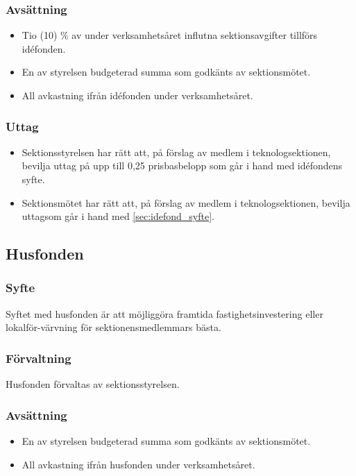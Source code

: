 \documentclass[a4paper, 10pt]{article}
\begin{document}
\subsubsection{Avsättning}
\begin{itemize}
\item Tio (10) \% av under verksamhetsåret influtna sektionsavgifter tillförs idéfonden.
\item En av styrelsen budgeterad summa som godkänts av sektionsmötet.
\item All avkastning ifrån idéfonden under verksamhetsåret.
\end{itemize}
\subsubsection{Uttag}
\begin{itemize}
  \item Sektionsstyrelsen har rätt att, på förslag av medlem i teknologsektionen, bevilja uttag på upp till 0,25 prisbasbelopp som går i hand med idéfondens syfte.
  \item Sektionsmötet har rätt att, på förslag av medlem i teknologsektionen, bevilja uttagsom går i hand med \ref{sec:idefond_syfte}.
\end{itemize}

\subsection{Husfonden}
\subsubsection{Syfte}
\label{sec:husfond_syfte}
Syftet med husfonden är att möjliggöra framtida fastighetsinvestering eller lokalför-värvning för sektionensmedlemmars bästa.
\subsubsection{Förvaltning}
Husfonden förvaltas av sektionsstyrelsen.
\subsubsection{Avsättning}
\begin{itemize}
  \item En av styrelsen budgeterad summa som godkänts av sektionsmötet.
  \item All avkastning ifrån husfonden under verksamhetsåret.
\end{itemize}
\end{document}
